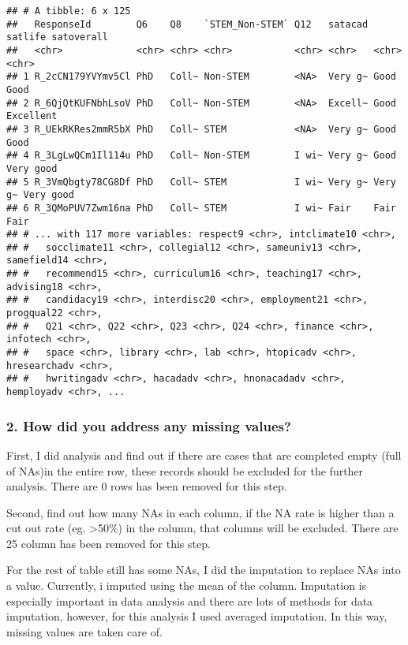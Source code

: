 \documentclass[
]{article}
\begin{document}
\begin{verbatim}
## # A tibble: 6 x 125
##   ResponseId        Q6    Q8    `STEM_Non-STEM` Q12   satacad satlife satoverall
##   <chr>             <chr> <chr> <chr>           <chr> <chr>   <chr>   <chr>     
## 1 R_2cCN179YVYmv5Cl PhD   Coll~ Non-STEM        <NA>  Very g~ Good    Good      
## 2 R_6QjQtKUFNbhLsoV PhD   Coll~ Non-STEM        <NA>  Excell~ Good    Excellent 
## 3 R_UEkRKRes2mmR5bX PhD   Coll~ STEM            <NA>  Very g~ Good    Good      
## 4 R_3LgLwQCm1Il114u PhD   Coll~ Non-STEM        I wi~ Very g~ Good    Very good 
## 5 R_3VmQbgty78CG8Df PhD   Coll~ STEM            I wi~ Very g~ Very g~ Very good 
## 6 R_3QMoPUV7Zwm16na PhD   Coll~ STEM            I wi~ Fair    Fair    Fair      
## # ... with 117 more variables: respect9 <chr>, intclimate10 <chr>,
## #   socclimate11 <chr>, collegial12 <chr>, sameuniv13 <chr>, samefield14 <chr>,
## #   recommend15 <chr>, curriculum16 <chr>, teaching17 <chr>, advising18 <chr>,
## #   candidacy19 <chr>, interdisc20 <chr>, employment21 <chr>, progqual22 <chr>,
## #   Q21 <chr>, Q22 <chr>, Q23 <chr>, Q24 <chr>, finance <chr>, infotech <chr>,
## #   space <chr>, library <chr>, lab <chr>, htopicadv <chr>, hresearchadv <chr>,
## #   hwritingadv <chr>, hacadadv <chr>, hnonacadadv <chr>, hemployadv <chr>, ...
\end{verbatim}

\hypertarget{how-did-you-address-any-missing-values}{%
\subsubsection{2. How did you address any missing
values?}\label{how-did-you-address-any-missing-values}}

First, I did analysis and find out if there are cases that are completed
empty (full of NAs)in the entire row, these records should be excluded
for the further analysis. There are 0 rows has been removed for this
step.

Second, find out how many NAs in each column, if the NA rate is higher
than a cut out rate (eg. \textgreater50\%) in the column, that columns
will be excluded. There are 25 column has been removed for this step.

For the rest of table still has some NAs, I did the imputation to
replace NAs into a value. Currently, i imputed using the mean of the
column. Imputation is especially important in data analysis and there
are lots of methods for data imputation, however, for this analysis I
used averaged imputation. In this way, missing values are taken care of.
\end{document}
